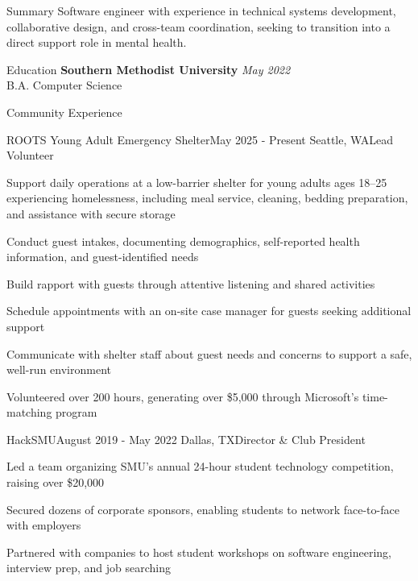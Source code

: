 \documentclass{resume}
\begin{document}
\begin{rSection}{Summary}
    Software engineer with experience in technical systems development, collaborative design, and cross-team coordination, seeking to transition into a direct support role in mental health.
\end{rSection}

\begin{rSection}{Education}
    {\bf Southern Methodist University} \hfill {\em May 2022}
    \\ B.A. Computer Science
\end{rSection}

\begin{rSection}{Community Experience}
    \begin{rSubsection}{ROOTS Young Adult Emergency Shelter}{May 2025 - Present \quad Seattle, WA}{Lead Volunteer}{}
        \item Support daily operations at a low-barrier shelter for young adults ages 18--25 experiencing homelessness, including meal service, cleaning, bedding preparation, and assistance with secure storage
        \item Conduct guest intakes, documenting demographics, self-reported health information, and guest-identified needs
        \item Build rapport with guests through attentive listening and shared activities
        \item Schedule appointments with an on-site case manager for guests seeking additional support
        \item Communicate with shelter staff about guest needs and concerns to support a safe, well-run environment
        \item Volunteered over 200 hours, generating over \$5,000 through Microsoft's time-matching program
    \end{rSubsection}

    \begin{rSubsection}{HackSMU}{August 2019 - May 2022 \quad Dallas, TX}{Director \& Club President}{}
        \item Led a team organizing SMU's annual 24-hour student technology competition, raising over \$20,000
        \item Secured dozens of corporate sponsors, enabling students to network face-to-face with employers
        \item Partnered with companies to host student workshops on software engineering, interview prep, and job searching
    \end{rSubsection}
\end{rSection}
\end{document}
